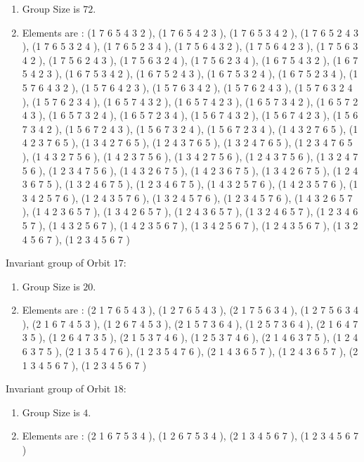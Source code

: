 \documentclass[12pt]{article}
\begin{document}
\begin{enumerate}
\item Group Size is $72$.
\item Elements are : (1 7 6 5 4 3 2  ), (1 7 6 5 4 2 3  ), (1 7 6 5 3 4 2  ), (1 7 6 5 2 4 3  ), (1 7 6 5 3 2 4  ), (1 7 6 5 2 3 4  ), (1 7 5 6 4 3 2  ), (1 7 5 6 4 2 3  ), (1 7 5 6 3 4 2  ), (1 7 5 6 2 4 3  ), (1 7 5 6 3 2 4  ), (1 7 5 6 2 3 4  ), (1 6 7 5 4 3 2  ), (1 6 7 5 4 2 3  ), (1 6 7 5 3 4 2  ), (1 6 7 5 2 4 3  ), (1 6 7 5 3 2 4  ), (1 6 7 5 2 3 4  ), (1 5 7 6 4 3 2  ), (1 5 7 6 4 2 3  ), (1 5 7 6 3 4 2  ), (1 5 7 6 2 4 3  ), (1 5 7 6 3 2 4  ), (1 5 7 6 2 3 4  ), (1 6 5 7 4 3 2  ), (1 6 5 7 4 2 3  ), (1 6 5 7 3 4 2  ), (1 6 5 7 2 4 3  ), (1 6 5 7 3 2 4  ), (1 6 5 7 2 3 4  ), (1 5 6 7 4 3 2  ), (1 5 6 7 4 2 3  ), (1 5 6 7 3 4 2  ), (1 5 6 7 2 4 3  ), (1 5 6 7 3 2 4  ), (1 5 6 7 2 3 4  ), (1 4 3 2 7 6 5  ), (1 4 2 3 7 6 5  ), (1 3 4 2 7 6 5  ), (1 2 4 3 7 6 5  ), (1 3 2 4 7 6 5  ), (1 2 3 4 7 6 5  ), (1 4 3 2 7 5 6  ), (1 4 2 3 7 5 6  ), (1 3 4 2 7 5 6  ), (1 2 4 3 7 5 6  ), (1 3 2 4 7 5 6  ), (1 2 3 4 7 5 6  ), (1 4 3 2 6 7 5  ), (1 4 2 3 6 7 5  ), (1 3 4 2 6 7 5  ), (1 2 4 3 6 7 5  ), (1 3 2 4 6 7 5  ), (1 2 3 4 6 7 5  ), (1 4 3 2 5 7 6  ), (1 4 2 3 5 7 6  ), (1 3 4 2 5 7 6  ), (1 2 4 3 5 7 6  ), (1 3 2 4 5 7 6  ), (1 2 3 4 5 7 6  ), (1 4 3 2 6 5 7  ), (1 4 2 3 6 5 7  ), (1 3 4 2 6 5 7  ), (1 2 4 3 6 5 7  ), (1 3 2 4 6 5 7  ), (1 2 3 4 6 5 7  ), (1 4 3 2 5 6 7  ), (1 4 2 3 5 6 7  ), (1 3 4 2 5 6 7  ), (1 2 4 3 5 6 7  ), (1 3 2 4 5 6 7  ), (1 2 3 4 5 6 7  )
\end{enumerate}
Invariant group of Orbit $17$:
\begin{enumerate}
\item Group Size is $20$.
\item Elements are : (2 1 7 6 5 4 3  ), (1 2 7 6 5 4 3  ), (2 1 7 5 6 3 4  ), (1 2 7 5 6 3 4  ), (2 1 6 7 4 5 3  ), (1 2 6 7 4 5 3  ), (2 1 5 7 3 6 4  ), (1 2 5 7 3 6 4  ), (2 1 6 4 7 3 5  ), (1 2 6 4 7 3 5  ), (2 1 5 3 7 4 6  ), (1 2 5 3 7 4 6  ), (2 1 4 6 3 7 5  ), (1 2 4 6 3 7 5  ), (2 1 3 5 4 7 6  ), (1 2 3 5 4 7 6  ), (2 1 4 3 6 5 7  ), (1 2 4 3 6 5 7  ), (2 1 3 4 5 6 7  ), (1 2 3 4 5 6 7  )
\end{enumerate}
Invariant group of Orbit $18$:
\begin{enumerate}
\item Group Size is $4$.
\item Elements are : (2 1 6 7 5 3 4  ), (1 2 6 7 5 3 4  ), (2 1 3 4 5 6 7  ), (1 2 3 4 5 6 7  )
\end{enumerate}
\end{document}
